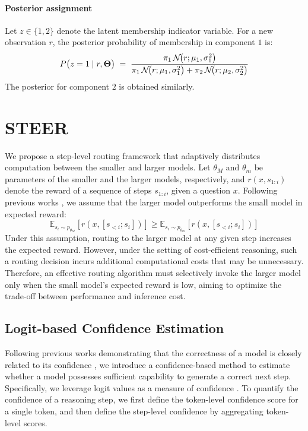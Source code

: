 \documentclass[letterpaper]{article} %
\newcommand{\N}[3]{\mathcal{N}\!\bigl(#1;#2,#3\bigr)}   %
\begin{document}
\paragraph{Posterior assignment}
Let \( z \in \{1,2\} \) denote the latent membership indicator variable. For a new observation \(r\), the posterior probability of membership in
component \(1\) is:
\begin{equation}\label{eq:post_z1}
  P\bigl(z = 1 \mid r,\boldsymbol{\Theta}\bigr)
  \;=\;
  \frac{%
    \pi_{1}\,\N{r}{\mu_{1}}{\sigma_{1}^{2}}%
  }{%
    \pi_{1}\,\N{r}{\mu_{1}}{\sigma_{1}^{2}}
    +\pi_{2}\,\N{r}{\mu_{2}}{\sigma_{2}^{2}}%
  }
\end{equation}
The posterior for component \(2\) is obtained similarly.

% 
\section{STEER}
 We propose a step-level routing framework that adaptively distributes computation between the smaller and larger models. Let $\theta_M$ and $\theta_m$ be parameters of the smaller and the larger models, respectively, and $r(x, s_{1:i})$ denote the reward of a sequence of steps $s_{1:i}$, given a question $x$. Following previous works \citep{liaoreward}, we assume that the larger model outperforms the small model in expected reward: 
\begin{equation}
\mathbb{E}_{s_i \sim p_{\theta_M}} \left[ r(x, [s_{<i}; s_i]) \right] \geq \mathbb{E}_{s_i \sim p_{\theta_m}} \left[ r(x, [s_{<i}; s_i]) \right]
\end{equation}
Under this assumption, routing to the larger model at any given step increases the expected reward. However, under the setting of cost-efficient reasoning, such a routing decision incurs additional computational costs that may be unnecessary. Therefore, an effective routing algorithm must selectively invoke the larger model only when the small model's expected reward is low, aiming to optimize the trade-off between performance and inference cost.

\subsection{Logit-based Confidence Estimation}
Following previous works demonstrating that the correctness of a model is closely related to its confidence \citep{xie2023self, wang2024chain, wangself}, we introduce a confidence-based method to estimate whether a model possesses sufficient capability to generate a correct next step.
Specifically, we leverage logit values as a measure of confidence \citep{wang2024chain, ma2025estimatingllmuncertaintyevidence}. To quantify the confidence of a reasoning step, we first define the token-level confidence score for a single token, and then define the step-level confidence by aggregating token-level scores.
\end{document}

